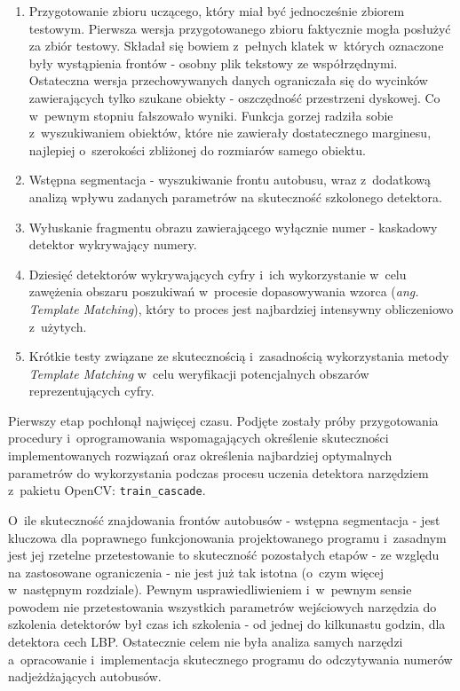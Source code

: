 \begin{enumerate}
    \item Przygotowanie zbioru uczącego, który miał być jednocześnie
        zbiorem testowym. Pierwsza wersja przygotowanego zbioru
        faktycznie mogła posłużyć za zbiór testowy. Składał się
        bowiem z~pełnych klatek w~których oznaczone były wystąpienia
        frontów - osobny plik tekstowy ze współrzędnymi. Ostateczna
        wersja przechowywanych danych ograniczała się do wycinków
        zawierających tylko szukane obiekty - oszczędność przestrzeni
        dyskowej. Co w~pewnym stopniu fałszowało wyniki. Funkcja
        gorzej radziła sobie z~wyszukiwaniem obiektów, które nie
        zawierały dostatecznego marginesu, najlepiej o~szerokości
        zbliżonej do rozmiarów samego obiektu.
    \item Wstępna segmentacja - wyszukiwanie frontu autobusu, wraz
        z~dodatkową analizą wpływu zadanych parametrów na skuteczność
        szkolonego detektora.
    \item Wyłuskanie fragmentu obrazu zawierającego wyłącznie numer -
        kaskadowy detektor wykrywający numery.
    \item Dziesięć detektorów wykrywających cyfry i~ich wykorzystanie
        w~celu zawężenia obszaru poszukiwań w~procesie dopasowywania 
        wzorca (\textit{ang. Template Matching}), który to proces
        jest najbardziej intensywny obliczeniowo z~użytych.
    \item Krótkie testy związane ze skutecznością i~zasadnością
        wykorzystania metody \textit{Template Matching} w~celu weryfikacji
        potencjalnych obszarów reprezentujących cyfry.
\end{enumerate}

Pierwszy etap pochłonął najwięcej czasu. Podjęte zostały próby 
przygotowania procedury i~oprogramowania wspomagających określenie
skuteczności implementowanych rozwiązań oraz określenia 
najbardziej optymalnych parametrów do wykorzystania podczas procesu
uczenia detektora narzędziem z~pakietu OpenCV: \verb|train_cascade|.

O~ile skuteczność znajdowania frontów autobusów - wstępna segmentacja - 
jest kluczowa dla poprawnego funkcjonowania projektowanego programu 
i~zasadnym jest jej rzetelne przetestowanie to skuteczność pozostałych
etapów - ze względu na zastosowane ograniczenia - nie jest już tak
istotna (o~czym więcej w~następnym rozdziale). Pewnym usprawiedliwieniem
i~w~pewnym sensie powodem nie przetestowania wszystkich parametrów
wejściowych narzędzia do szkolenia detektorów był czas ich szkolenia 
- od jednej do kilkunastu godzin, dla detektora cech LBP. Ostatecznie
celem nie była analiza samych narzędzi a~opracowanie i~implementacja
skutecznego programu do odczytywania numerów nadjeżdżających autobusów.

